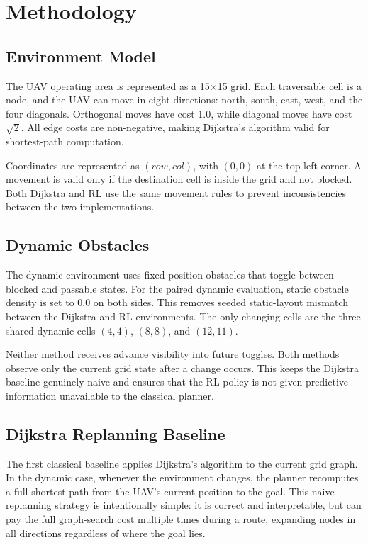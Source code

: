 \section{Methodology}
\label{sec:methodology}

\subsection{Environment Model}

The UAV operating area is represented as a 15$\times$15 grid. Each traversable cell is a node, and the UAV can move in eight directions: north, south, east, west, and the four diagonals. Orthogonal moves have cost 1.0, while diagonal moves have cost $\sqrt{2}$. All edge costs are non-negative, making Dijkstra's algorithm valid for shortest-path computation.

Coordinates are represented as $(row, col)$, with $(0,0)$ at the top-left corner. A movement is valid only if the destination cell is inside the grid and not blocked. Both Dijkstra and RL use the same movement rules to prevent inconsistencies between the two implementations.

\subsection{Dynamic Obstacles}

The dynamic environment uses fixed-position obstacles that toggle between blocked and passable states. For the paired dynamic evaluation, static obstacle density is set to 0.0 on both sides. This removes seeded static-layout mismatch between the Dijkstra and RL environments. The only changing cells are the three shared dynamic cells $(4,4)$, $(8,8)$, and $(12,11)$.

Neither method receives advance visibility into future toggles. Both methods observe only the current grid state after a change occurs. This keeps the Dijkstra baseline genuinely naive and ensures that the RL policy is not given predictive information unavailable to the classical planner.

\subsection{Dijkstra Replanning Baseline}

The first classical baseline applies Dijkstra's algorithm to the current grid graph. In the dynamic case, whenever the environment changes, the planner recomputes a full shortest path from the UAV's current position to the goal. This naive replanning strategy is intentionally simple: it is correct and interpretable, but can pay the full graph-search cost multiple times during a route, expanding nodes in all directions regardless of where the goal lies.

